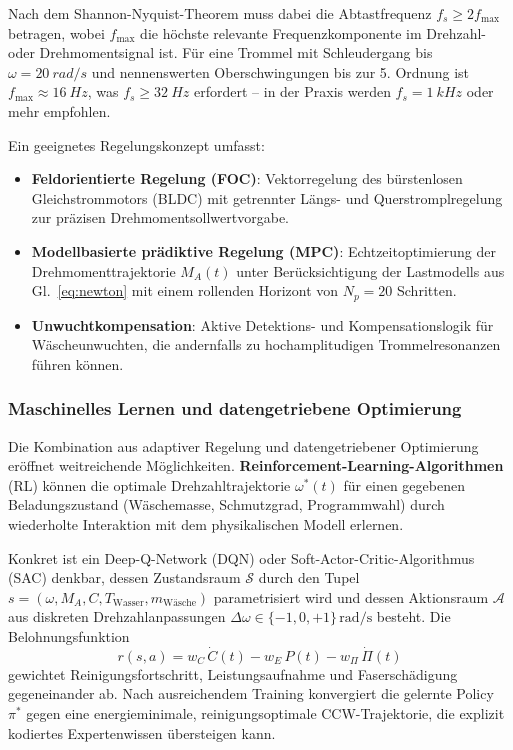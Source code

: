 ﻿\documentclass[12pt,a4paper]{article}
\theoremstyle{remark}
\begin{document}
	Nach dem Shannon-Nyquist-Theorem \cite{epp2026digi} muss dabei die Abtastfrequenz
	$f_s \geq 2f_{\max}$ betragen, wobei $f_{\max}$ die höchste relevante
	Frequenzkomponente im Drehzahl- oder Drehmomentsignal ist. Für eine Trommel mit
	Schleudergang bis $\omega = \SI{20}{rad/s}$ und nennenswerten Oberschwingungen bis zur
	5. Ordnung ist $f_{\max} \approx \SI{16}{Hz}$, was $f_s \geq \SI{32}{Hz}$ erfordert --
	in der Praxis werden $f_s = \SI{1}{kHz}$ oder mehr empfohlen.
	
	Ein geeignetes Regelungskonzept umfasst:
	\begin{itemize}
		\item \textbf{Feldorientierte Regelung (FOC)}: Vektorregelung des bürstenlosen
		Gleichstrommotors (BLDC) mit getrennter Längs- und Querstromplregelung zur
		präzisen Drehmomentsollwertvorgabe.
		\item \textbf{Modellbasierte prädiktive Regelung (MPC)}: Echtzeitoptimierung der
		Drehmomenttrajektorie $M_A(t)$ unter Berücksichtigung der Lastmodells
		aus Gl.~\eqref{eq:newton} mit einem rollenden Horizont von $N_p = 20$ Schritten.
		\item \textbf{Unwuchtkompensation}: Aktive Detektions- und Kompensationslogik für
		Wäsche\-unwuchten, die andernfalls zu hochamplitudigen Trommelresonanzen führen können.
	\end{itemize}
	
	\subsubsection{Maschinelles Lernen und datengetriebene Optimierung}
	
	Die Kombination aus adaptiver Regelung und datengetriebener Optimierung eröffnet
	weitreichende Möglichkeiten. \textbf{Reinforcement-Learning-Algorithmen} (RL) können
	die optimale Drehzahltrajektorie $\omega^*(t)$ für einen gegebenen Beladungszustand
	(Wäschemasse, Schmutzgrad, Programmwahl) durch wiederholte Interaktion mit dem
	physikalischen Modell erlernen.
	
	Konkret ist ein Deep-Q-Network (DQN) oder Soft-Actor-Critic-Algorithmus (SAC) denkbar,
	dessen Zustandsraum $\mathcal{S}$ durch den Tupel
	$s = (\omega, M_A, C, T_{\mathrm{Wasser}}, m_{\mathrm{Wäsche}})$
	parametrisiert wird und dessen Aktionsraum $\mathcal{A}$ aus diskreten
	Drehzahlanpassungen $\Delta\omega \in \{-1, 0, +1\}\,\mathrm{rad/s}$ besteht.
	Die Belohnungsfunktion
	\begin{equation}
		r(s,a) = w_C\,\dot{C}(t) - w_E\,P(t) - w_\Pi\,\dot{\Pi}(t)
	\end{equation}
	gewichtet Reinigungsfortschritt, Leistungsaufnahme und Faserschädigung gegeneinander
	ab. Nach ausreichendem Training konvergiert die gelernte Policy $\pi^*$ gegen eine
	energieminimale, reinigungsoptimale CCW-Trajektorie, die explizit kodiertes
	Expertenwissen übersteigen kann.
	
\end{document}
